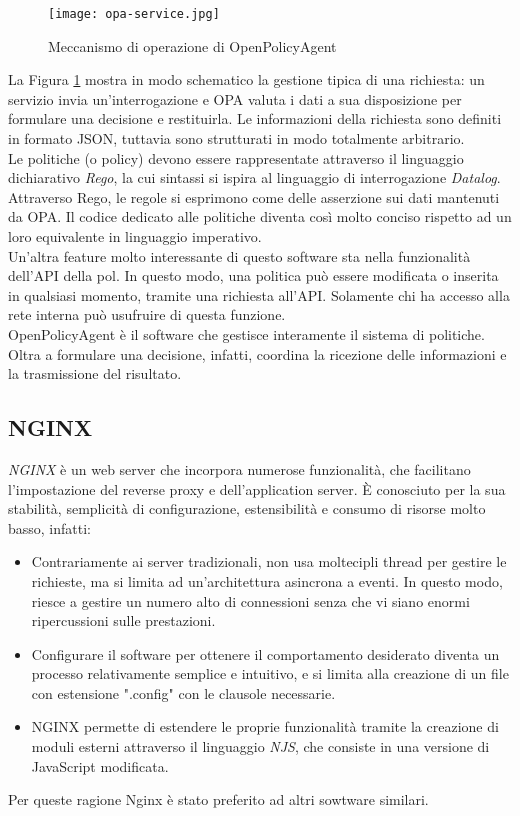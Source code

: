 \begin{figure}[h]
    \texttt{[image: opa-service.jpg]}
    \centering
    \caption{Meccanismo di operazione di OpenPolicyAgent}
    \label{OPAWork}
\end{figure} 
La Figura \ref*{OPAWork} mostra in modo schematico la gestione tipica di una richiesta: un servizio invia un'interrogazione e OPA valuta i dati a sua disposizione per formulare una decisione e restituirla. 
Le informazioni della richiesta sono definiti in formato JSON, tuttavia sono strutturati in modo totalmente arbitrario. 
\\ Le politiche (o policy) devono essere rappresentate attraverso il linguaggio dichiarativo 
\textit{Rego}, la cui sintassi si ispira al linguaggio 
di interrogazione \textit{Datalog}. 
Attraverso Rego, le regole si esprimono come delle asserzione sui dati mantenuti da OPA.
Il codice dedicato alle politiche diventa così molto conciso rispetto ad un loro equivalente in 
linguaggio imperativo. 
\\ Un'altra feature molto interessante di questo software sta nella funzionalità dell'API della pol. In questo modo, una politica può essere modificata o inserita 
in qualsiasi momento, tramite una richiesta all'API. Solamente chi ha accesso alla rete interna può usufruire di questa funzione. 
\\ OpenPolicyAgent è il software che gestisce interamente il sistema di politiche. Oltra a formulare una decisione,
 infatti, coordina la ricezione delle informazioni e la trasmissione del risultato.  


\subsection{NGINX}
\textit{NGINX} è un web server che incorpora numerose funzionalità, che facilitano l'impostazione del reverse proxy e dell'application server. 
È conosciuto per la sua stabilità, semplicità di configurazione, estensibilità e consumo di risorse molto basso, infatti:
\begin{itemize}
    \item 
    Contrariamente ai server tradizionali,  
    non usa moltecipli thread per gestire le richieste, ma si limita ad un'architettura asincrona a eventi. 
    In questo modo, riesce a gestire un numero alto di connessioni senza che vi siano enormi ripercussioni sulle prestazioni. 
    
    \item Configurare il software per ottenere il comportamento desiderato diventa un processo relativamente semplice e intuitivo, e si
    limita alla creazione di un file con estensione ".config" con le clausole necessarie. 
    \item NGINX permette di estendere le proprie funzionalità tramite la creazione di moduli esterni attraverso il linguaggio \textit{NJS}, 
    che consiste in una versione di JavaScript modificata. 
\end{itemize}
Per queste ragione Nginx è stato preferito ad altri sowtware similari.

